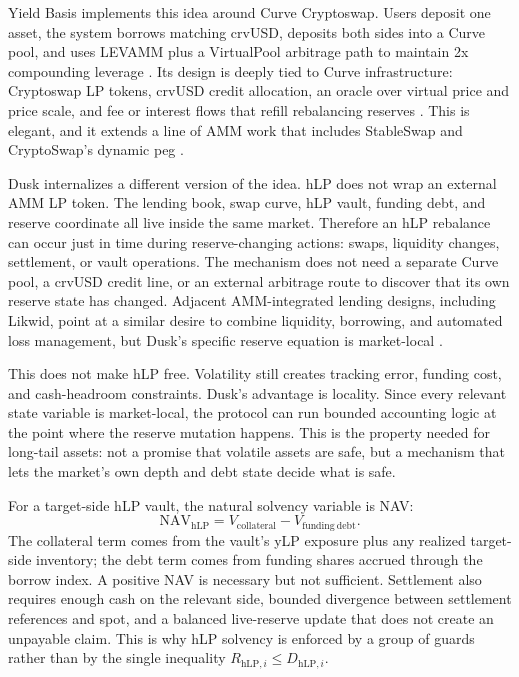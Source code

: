 \documentclass[11pt]{article}
\newcommand{\hlp}{\mathrm{hLP}}
\begin{document}
Yield Basis implements this idea around Curve Cryptoswap. Users deposit one asset, the system borrows matching crvUSD, deposits both sides into a Curve pool, and uses LEVAMM plus a VirtualPool arbitrage path to maintain 2x compounding leverage \cite{yieldbasis-technical,yieldbasis-governance}. Its design is deeply tied to Curve infrastructure: Cryptoswap LP tokens, crvUSD credit allocation, an oracle over virtual price and price scale, and fee or interest flows that refill rebalancing reserves \cite{yieldbasis-fees,yieldbasis-oracle}. This is elegant, and it extends a line of AMM work that includes StableSwap and CryptoSwap's dynamic peg \cite{curve-stableswap,curve-cryptopools}.

Dusk internalizes a different version of the idea. hLP does not wrap an external AMM LP token. The lending book, swap curve, hLP vault, funding debt, and reserve coordinate all live inside the same market. Therefore an hLP rebalance can occur just in time during reserve-changing actions: swaps, liquidity changes, settlement, or vault operations. The mechanism does not need a separate Curve pool, a crvUSD credit line, or an external arbitrage route to discover that its own reserve state has changed. Adjacent AMM-integrated lending designs, including Likwid, point at a similar desire to combine liquidity, borrowing, and automated loss management, but Dusk's specific reserve equation is market-local \cite{likwid-framework}.

This does not make hLP free. Volatility still creates tracking error, funding cost, and cash-headroom constraints. Dusk's advantage is locality. Since every relevant state variable is market-local, the protocol can run bounded accounting logic at the point where the reserve mutation happens. This is the property needed for long-tail assets: not a promise that volatile assets are safe, but a mechanism that lets the market's own depth and debt state decide what is safe.

For a target-side hLP vault, the natural solvency variable is NAV:
\begin{equation}
\mathrm{NAV}_{\hlp}=V_{\mathrm{collateral}}-V_{\mathrm{funding\ debt}}.
\end{equation}
The collateral term comes from the vault's yLP exposure plus any realized target-side inventory; the debt term comes from funding shares accrued through the borrow index. A positive NAV is necessary but not sufficient. Settlement also requires enough cash on the relevant side, bounded divergence between settlement references and spot, and a balanced live-reserve update that does not create an unpayable claim. This is why hLP solvency is enforced by a group of guards rather than by the single inequality $R_{\hlp,i}\le D_{\hlp,i}$.
\end{document}
